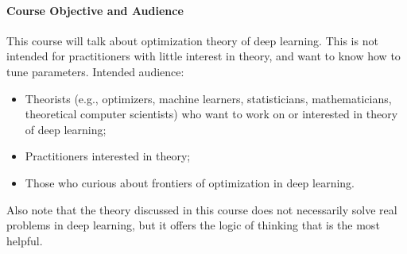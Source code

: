 \paragraph{Course Objective and Audience}
This course will talk about optimization theory of deep learning. This is not intended for practitioners with little interest in theory, and want to know how to tune parameters. 
Intended audience:
\begin{itemize}
\item
Theorists (e.g., optimizers, machine learners, statisticians, mathematicians,
theoretical computer scientists) who want to work on or
interested in theory of deep learning;
\item
Practitioners interested in theory;
\item
Those who curious about frontiers of optimization in deep learning.
\end{itemize}
Also note that the theory discussed in this course does not necessarily solve real problems in deep learning, but it offers the logic of thinking that is the most helpful.

